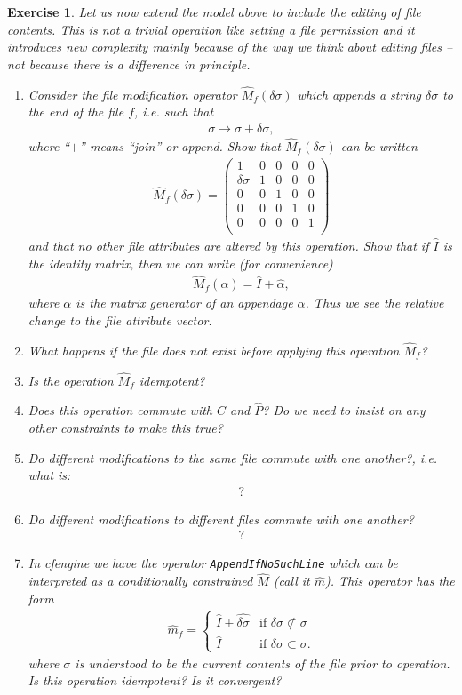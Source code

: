 \documentclass{book}
\newtheorem{exercise}{Exercise}
\def\beq{\begin{eqnarray}}
\def\eeq{\end{eqnarray}}
\begin{document}
\begin{exercise} Let us now extend the model above to include the editing of
file contents. This is not a trivial operation like setting a file
permission and it introduces new complexity mainly because of the
way we think about editing files -- not because there is a difference
in principle.
\begin{enumerate}

\item Consider the file modification operator $\hat M_f(\delta\sigma)$
which appends a string $\delta\sigma$ to the end of the file $f$, i.e.
such that 
\beq
\sigma\rightarrow\sigma+\delta \sigma,
\eeq
where ``$+$'' means ``join'' or append.
Show that $\hat M_f(\delta\sigma)$ can be written
\beq
\hat M_f(\delta\sigma) = \left(
\begin{array}{ccccc}
1 & 0 & 0 & 0 & 0\\
\delta\sigma & 1 & 0 & 0 & 0\\
0 & 0 & 1 & 0 & 0\\
0 & 0 & 0 & 1 & 0\\
0 & 0 & 0 & 0 & 1\\
\end{array}
\right)
\eeq
and that no other file attributes are altered by this operation.
Show that if $\hat I$ is the identity matrix, then we can write (for convenience)
\beq
\hat M_f(\alpha) = \hat I + \hat{\alpha},
\eeq
where $\alpha$ is the matrix generator of an appendage $\alpha$. Thus
we see the relative change to the file attribute vector.

\item What happens if the file does not exist before applying this operation $\hat M_f$?

\item Is the operation $\hat M_f$ idempotent?
\item Does this operation commute with $\hat C$ and $\hat P$? Do we
need to insist on any other constraints to make this true?
\item Do different modifications to the same file commute with one another?, i.e. what is:
\beq
[\hat M_f(\alpha),\hat M_f(\beta)]?
\eeq
\item Do different modifications to different files commute with one another?
\beq
[\hat M_f(\alpha),\hat M_{f'}(\beta)]?
\eeq

\item In cfengine we have the operator {\tt AppendIfNoSuchLine}
which can be interpreted as a conditionally constrained $\hat M$ (call it
$\hat m$).
This operator has the form
\beq
\hat m_f =\left\{
\begin{array}{ll}
\hat I+\hat{\delta\sigma} & \mbox{if $\delta\sigma \not\subset\sigma$}\\
\hat I  & \mbox{if $\delta\sigma \subset \sigma$}.
\end{array}
\right.
\eeq
where $\sigma$ is understood to be the current contents of the file
prior to operation. Is this operation idempotent? Is it convergent?

\end{enumerate}
\end{exercise}
\begin{solution}
\end{solution}
\end{document}
